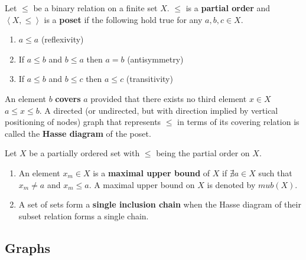 \def\posetr{\le}

\begin{definition}[Poset]
  \label{def:posetdef}    
  Let $\posetr$ be a binary relation on a finite set $X$. $\posetr$ is a \textbf{
    partial order} and $\left< X,\posetr \right>$  is a \textbf{ poset}
  if the following hold true for any $a, b, c \in X$.
 \parindent  {} 
  \begin{enumerate}
  \item $a \posetr a$ (reflexivity)
  \item If $a \posetr b$ and $b \posetr a$ then $a = b$ (antisymmetry)
  \item If $a \posetr b$ and $b \posetr c$ then $a \posetr c$
    (transitivity)
  \end{enumerate}

  An element $b$ \textbf{covers} $a$ provided that there exists no
  third element $x \in X$ \stt $a \posetr x \posetr b$.  A directed
  (or undirected, but with direction implied by vertical positioning
  of nodes) graph that represents $\posetr$ in terms of its covering
  relation is called the \textbf{Hasse diagram} of the poset.
\end{definition}

\begin{definition}
  \label{def:poset} 
  Let $X$ be a partially ordered set with $\posetr$ being the
  partial order on $X$.

  \begin{enumerate}
  \hangindent {}
  \item An element $x_m \in X$ is a
    \textbf{maximal upper bound} of $X$ if $\nexists a \in X$ such
    that $x_m \ne a$ and $x_m \posetr a$.  A maximal upper bound on $X$ is
    denoted by $mub(X)$.

  \item A set of sets form a \textbf{single
      inclusion chain} when the Hasse diagram of their subset relation
    forms a single chain.
  \end{enumerate}
\end{definition}

\subsection{Graphs}

